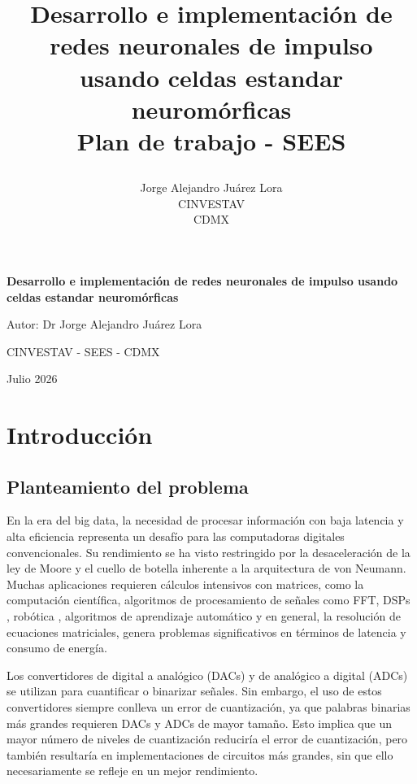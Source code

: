 \documentclass[letter, 12pt]{article}
\title{
    \textbf{Desarrollo e implementación de redes neuronales de impulso usando celdas estandar neuromórficas} \\ \vspace{1cm} \Large Plan de trabajo - SEES
\author{\Large Jorge Alejandro Juárez Lora \\ CINVESTAV \\ CDMX}
}
\begin{document}
\begin{titlepage}
    \centering
    \vspace{4cm}
    {\Huge \textbf{Desarrollo e implementación de redes neuronales de impulso usando celdas estandar neuromórficas} \par}
    \vspace{1.5cm}
    \vspace{2cm}
    {\Large Autor: Dr Jorge Alejandro Juárez Lora \par}
    \vspace{0.5cm}
         {\Large CINVESTAV - SEES - CDMX \par}
    \vspace{3cm}
    {\Large Julio 2026 \par}
    \vfill
\end{titlepage}

\tableofcontents
\newpage

\section{Introducción}
\subsection{Planteamiento del problema}
En la era del big data, la necesidad de procesar información con baja latencia y alta eficiencia representa un desafío para las computadoras digitales convencionales. Su rendimiento se ha visto restringido por la desaceleración de la ley de Moore y el cuello de botella inherente a la arquitectura de von Neumann. Muchas aplicaciones requieren cálculos intensivos con matrices, como la computación científica, algoritmos de procesamiento de señales como FFT, DSPs , robótica , algoritmos de aprendizaje automático y en general, la resolución de ecuaciones matriciales, genera problemas significativos en términos de latencia y consumo de energía.


Los convertidores de digital a analógico (DACs) y de analógico a digital (ADCs) se utilizan para cuantificar o binarizar señales. Sin embargo, el uso de estos convertidores siempre conlleva un error de cuantización, ya que palabras binarias más grandes requieren DACs y ADCs de mayor tamaño. Esto implica que un mayor número de niveles de cuantización reduciría el error de cuantización, pero también resultaría en implementaciones de circuitos más grandes, sin que ello necesariamente se refleje en un mejor rendimiento.
\end{document}
